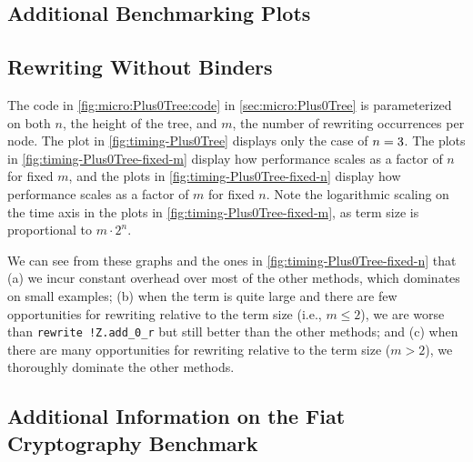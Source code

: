\begin{subappendices}
\section{Additional Benchmarking Plots} \label{sec:additionalPlots}

\subsection{Rewriting Without Binders} \label{sec:additionalPlots:Plus0Tree}

The code in \autoref{fig:micro:Plus0Tree:code} in \autoref{sec:micro:Plus0Tree} is parameterized on both $n$, the height of the tree, and $m$, the number of rewriting occurrences per node.
The plot in \autoref{fig:timing-Plus0Tree} displays only the case of $n=3$.
The plots in \autoref{fig:timing-Plus0Tree-fixed-m} display how performance scales as a factor of $n$ for fixed $m$, and the plots in \autoref{fig:timing-Plus0Tree-fixed-n} display how performance scales as a factor of $m$ for fixed $n$.
Note the logarithmic scaling on the time axis in the plots in \autoref{fig:timing-Plus0Tree-fixed-m}, as term size is proportional to $m\cdot 2^n$.

We can see from these graphs and the ones in \autoref{fig:timing-Plus0Tree-fixed-n} that
(a) we incur constant overhead over most of the other methods, which dominates on small examples;
(b) when the term is quite large and there are few opportunities for rewriting relative to the term size (i.e., $m \le 2$), we are worse than \texttt{rewrite !Z.add_0_r} but still better than the other methods; and
(c) when there are many opportunities for rewriting relative to the term size ($m > 2$), we thoroughly dominate the other methods.

\clearpage

\subsection{Additional Information on the Fiat Cryptography Benchmark} \label{sec:additionalPlots:FiatCrypto} \label{sec:additionalMacro}


\end{subappendices}
